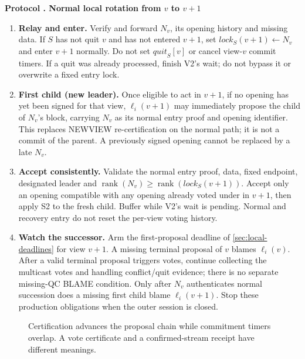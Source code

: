 \documentclass[11pt,a4paper,onecolumn]{article}
\newcommand{\rank}{\operatorname{rank}}
\newcommand{\changed}[1]{{\color{red}#1}}
\newcounter{protocol}
\newenvironment{protocol}[2]{\refstepcounter{protocol}\label{#1}
\begin{mdframed}[nobreak=true,linewidth=.6pt,skipabove=9pt,skipbelow=9pt,
innertopmargin=7pt,innerbottommargin=7pt]\small
\noindent\textbf{Protocol \theprotocol. #2}\par\smallskip}{\end{mdframed}}
\begin{document}
\begin{protocol}{alg:normal-local}{\changed{Normal local rotation from $v$ to $v+1$}}
\begingroup\color{red}
\begin{enumerate}[label=\textbf{N\arabic*.}]
\item \textbf{Relay and enter.} Verify and forward $N_v$, its opening history
and missing data. If $S$ has not quit $v$ and has not entered $v+1$, set
$\mathit{lock}_S(v+1)\gets N_v$ and enter $v+1$ normally. Do not set
$\mathit{quit}_S[v]$ or cancel view-$v$ commit timers. If a quit was already
processed, finish V2's wait; do not bypass it or overwrite a fixed entry lock.
\item \textbf{First child (new leader).} Once eligible to act in $v+1$, if
no opening has yet been signed for that view, $\ell_i(v+1)$ may immediately
propose the child of $N_v$'s block, carrying $N_v$ as its normal entry proof
and opening identifier. This replaces NEWVIEW re-certification on the normal
path; it is not a commit of the parent. A previously signed opening cannot
be replaced by a late $N_v$.
\item \textbf{Accept consistently.} Validate the normal entry proof, data,
fixed endpoint, designated leader and $\rank(N_v)\geq\rank(\mathit{lock}_S(v+1))$.
Accept only an opening compatible with any opening already voted under in
$v+1$, then apply S2 to the fresh child. Buffer while V2's wait is pending.
Normal and recovery entry do not reset the per-view voting history.
\item \textbf{Watch the successor.} Arm the first-proposal deadline of
\cref{sec:local-deadlines} for view $v+1$. A missing terminal proposal of $v$ blames $\ell_i(v)$. After a valid
terminal proposal triggers votes, continue collecting the multicast votes
and handling conflict/quit evidence; there is no separate missing-QC BLAME
condition. Only after $N_v$ authenticates normal succession does a missing
first child blame $\ell_i(v+1)$.
Stop these production obligations when the outer session is closed.
\end{enumerate}
\endgroup
\end{protocol}

\begin{figure}[H]\centering

\caption{Certification advances the proposal chain while commitment timers
overlap. A vote certificate and a confirmed-stream receipt have different meanings.}
\label{fig:pipeline}
\end{figure}
\end{document}

